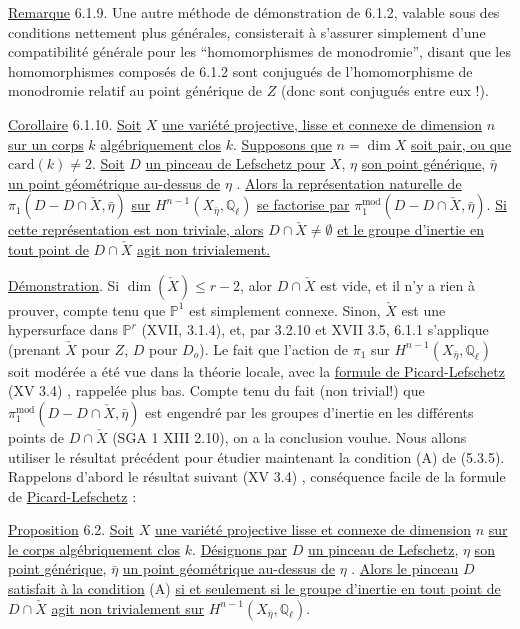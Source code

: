 \underline{Remarque} 6.1.9. Une autre méthode de démonstration de 6.1.2, valable sous des conditions nettement plus générales, consisterait à s'assurer simplement d'une compatibilité générale pour les ``homomorphismes de monodromie'', disant que les homomorphismes composés de 6.1.2 sont conjugués de l'homomorphisme de monodromie relatif au point générique de $Z$ (donc sont conjugués entre eux !).



\underline{Corollaire} 6.1.10. \underline{Soit} $X$ \underline{une variété projective, lisse et connexe de dimension} $n$ \underline{sur un corps} $k$ \underline{algébriquement clos} $k$. \underline{Supposons que} $n = \dim X$ \underline{soit pair, ou que} $\mathrm{card}(k) \neq 2$. \underline{Soit} $D$ \underline{un pinceau de Lefschetz pour} $X$, $\eta$ \underline{son point générique}, $\bar{\eta}$ \underline{un point géométrique au-dessus de} $\eta$ . \underline{Alors la représentation naturelle de} $\pi_1(D - D \cap \check{X}, \bar{\eta})$ \underline{sur} $H^{n-1}(X_{\bar{\eta}},\mathbb{Q}_\ell)$ \underline{se factorise par} $\pi_1^{\mathrm{mod}}(D - D \cap \check{X}, \bar{\eta})$. \underline{Si cette représentation est non triviale, alors} $D \cap \check{X} \neq \emptyset$ \underline{et le groupe d'inertie en tout point de} $D \cap \check{X}$ \underline{agit non trivialement.}

\underline{Démonstration}. Si $\dim (\check{X}) \leq r-2$, alor $D \cap \check{X}$ est vide, et il n'y a rien à prouver, compte tenu que $\mathbb{P}^1$ est simplement connexe. Sinon, $\check{X}$ est une hypersurface dans $\mathbb{P}^r$ (XVII, 3.1.4), et, par 3.2.10 et XVII 3.5, 6.1.1 s'applique (prenant $\check{X}$ pour $Z$, $D$ pour $D_o$). Le fait que l'action de $\pi_1$ sur $H^{n-1}(X_{\bar{\eta}} , \mathbb{Q}_\ell)$ soit modérée a été vue dans la théorie locale, avec la \underline{formule de Picard-Lefschetz} (XV 3.4) , rappelée plus bas. Compte tenu du fait (non trivial!) que $\pi_1^{\mathrm{mod}}(D - D \cap \check{X}, \bar{\eta})$ est engendré par les groupes d'inertie en les différents points de $D \cap \check{X}$ (SGA 1 XIII 2.10), on a la conclusion voulue. Nous allons utiliser le résultat précédent pour étudier maintenant la condition (A) de (5.3.5). Rappelons d'abord le résultat suivant (XV 3.4) , conséquence facile de la formule de \underline{Picard-Lefschetz} :



\underline{Proposition} 6.2. \underline{Soit} $X$ \underline{une variété projective lisse et connexe de dimension} $n$ \underline{sur le corps algébriquement clos} $k$. \underline{Désignons par} $D$ \underline{un pinceau de Lefschetz}, $\eta$ \underline{son point générique}, $\bar{\eta}$ \underline{un point géométrique au-dessus de} $\eta$ . \underline{Alors le pinceau} $D$ \underline{satisfait à la condition} (A) \underline{si et seulement si le groupe d'inertie en tout point de} $D \cap \check{X}$ \underline{agit non trivialement sur} $H^{n-1}(X_{\bar{\eta}},\mathbb{Q}_\ell)$.

